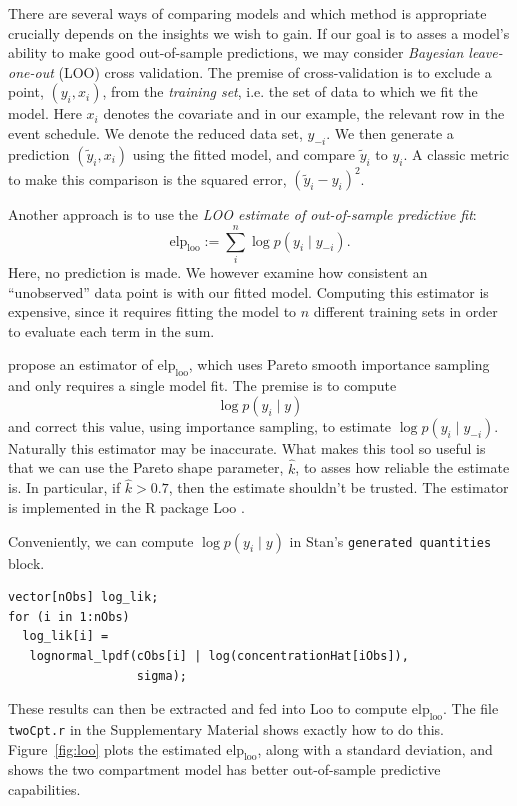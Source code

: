 There are several ways of comparing models and which method is appropriate crucially depends on the insights we wish to gain.
If our goal is to asses a model's ability to make good out-of-sample predictions, we may consider \textit{Bayesian leave-one-out} (LOO) cross validation.
The premise of cross-validation is to exclude a point, $(y_i, x_i)$, from the \textit{training set}, i.e. the set of data to which we fit the model.
Here $x_i$ denotes the covariate and in our example, the relevant row in the event schedule.
We denote the reduced data set, $y_{-i}$.
We then generate a prediction $(\tilde y_i, x_i)$ using the fitted model, and compare $\tilde y_i$ to $y_i$.
A classic metric to make this comparison is the squared error, $(\tilde y_i - y_i)^2$.

Another approach is to use the \textit{LOO estimate of out-of-sample predictive fit}:
\begin{equation*}
  \mathrm{elp}_\mathrm{loo} := \sum_{i}^n \log p(y_i \mid y_{-i}).
\end{equation*}
%
Here, no prediction is made.
We however examine how consistent an ``unobserved'' data point is with our fitted model.
Computing this estimator is expensive, since it requires fitting the model to $n$ different training sets in order to evaluate each term in the sum.

\citet{Vehtari:2016} propose an estimator of $\mathrm{elp}_\mathrm{loo}$, which uses Pareto smooth importance sampling and only requires a single model fit.
The premise is to compute
\begin{equation*}
  \log p(y_i \mid y)
\end{equation*}
and correct this value, using importance sampling, to estimate $\log p(y_i \mid y_{-i})$.
Naturally this estimator may be inaccurate.
What makes this tool so useful is that we can use the Pareto shape parameter, $\hat k$, to asses how reliable the estimate is.
In particular, if $\hat k > 0.7$, then the estimate shouldn't be trusted.
The estimator is implemented in the R package Loo \cite{Gabry:2020}.

Conveniently, we can compute $\log p(y_i \mid y)$ in Stan's \texttt{generated quantities} block.
\begin{lstlisting}
vector[nObs] log_lik;
for (i in 1:nObs)
  log_lik[i] = 
   lognormal_lpdf(cObs[i] | log(concentrationHat[iObs]),
                  sigma);
\end{lstlisting}
These results can then be extracted and fed into Loo to compute $\mathrm{elp}_\mathrm{loo}$.
The file \texttt{twoCpt.r} in the Supplementary Material shows exactly how to do this.
Figure~\ref{fig:loo} plots the estimated $\mathrm{elp}_\mathrm{loo}$, along with a standard deviation, and shows the two compartment model has better out-of-sample predictive capabilities.

